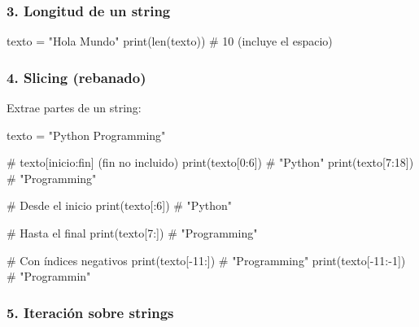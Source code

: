 \documentclass[
  doc,
  floatsintext,
  longtable,
  a4paper,
  nolmodern,
  notxfonts,
  notimes,
  12pt,
  colorlinks=true,linkcolor=blue,citecolor=blue,urlcolor=blue]{apa7}
\newenvironment{Shaded}{\begin{snugshade}}{\end{snugshade}}
\newcommand{\BuiltInTok}[1]{\textcolor[rgb]{0.00,0.23,0.31}{#1}}
\newcommand{\CommentTok}[1]{\textcolor[rgb]{0.37,0.37,0.37}{#1}}
\newcommand{\DecValTok}[1]{\textcolor[rgb]{0.68,0.00,0.00}{#1}}
\newcommand{\NormalTok}[1]{\textcolor[rgb]{0.00,0.23,0.31}{#1}}
\newcommand{\OperatorTok}[1]{\textcolor[rgb]{0.37,0.37,0.37}{#1}}
\newcommand{\StringTok}[1]{\textcolor[rgb]{0.13,0.47,0.30}{#1}}
\begin{document}
\subsubsection{3. Longitud de un string}\label{longitud-de-un-string}

\begin{Shaded}
\begin{Highlighting}[]
\NormalTok{texto }\OperatorTok{=} \StringTok{"Hola Mundo"}
\BuiltInTok{print}\NormalTok{(}\BuiltInTok{len}\NormalTok{(texto))  }\CommentTok{\# 10 (incluye el espacio)}
\end{Highlighting}
\end{Shaded}

\subsubsection{4. Slicing (rebanado)}\label{slicing-rebanado}

Extrae partes de un string:

\begin{Shaded}
\begin{Highlighting}[]
\NormalTok{texto }\OperatorTok{=} \StringTok{"Python Programming"}

\CommentTok{\# texto[inicio:fin]  (fin no incluido)}
\BuiltInTok{print}\NormalTok{(texto[}\DecValTok{0}\NormalTok{:}\DecValTok{6}\NormalTok{])   }\CommentTok{\# "Python"}
\BuiltInTok{print}\NormalTok{(texto[}\DecValTok{7}\NormalTok{:}\DecValTok{18}\NormalTok{])  }\CommentTok{\# "Programming"}

\CommentTok{\# Desde el inicio}
\BuiltInTok{print}\NormalTok{(texto[:}\DecValTok{6}\NormalTok{])    }\CommentTok{\# "Python"}

\CommentTok{\# Hasta el final}
\BuiltInTok{print}\NormalTok{(texto[}\DecValTok{7}\NormalTok{:])    }\CommentTok{\# "Programming"}

\CommentTok{\# Con índices negativos}
\BuiltInTok{print}\NormalTok{(texto[}\OperatorTok{{-}}\DecValTok{11}\NormalTok{:])  }\CommentTok{\# "Programming"}
\BuiltInTok{print}\NormalTok{(texto[}\OperatorTok{{-}}\DecValTok{11}\NormalTok{:}\OperatorTok{{-}}\DecValTok{1}\NormalTok{]) }\CommentTok{\# "Programmin"}
\end{Highlighting}
\end{Shaded}

\subsubsection{5. Iteración sobre
strings}\label{iteraciuxf3n-sobre-strings}
\end{document}
